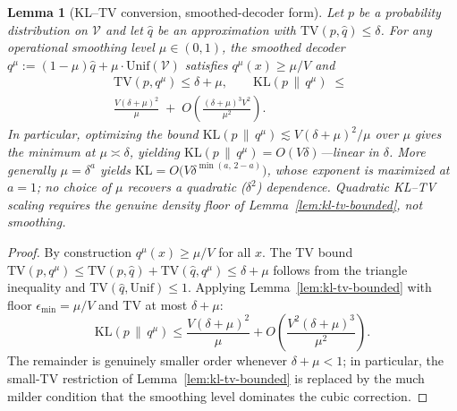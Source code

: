 \documentclass[11pt]{article}
\newcommand{\V}{\mathcal{V}}
\newcommand{\KLs}{\mathrm{KL}}
\newcommand{\TV}{\mathrm{TV}}
\theoremstyle{plain}
\newtheorem{lemma}[theorem]{Lemma}
\theoremstyle{definition}
\theoremstyle{remark}
\begin{document}
\begin{lemma}[KL--TV conversion, smoothed-decoder form]
\label{lem:kl-tv-smoothed}
Let $p$ be a probability distribution on $\V$ and let $\hat q$ be
an approximation with $\TV(p, \hat q) \leq \delta$. For any
\emph{operational smoothing level} $\mu \in (0, 1)$, the smoothed
decoder $q^{\mu} := (1-\mu) \hat q + \mu \cdot \mathrm{Unif}(\V)$
satisfies $q^{\mu}(x) \geq \mu/V$ and
\[
\begin{gathered}
\TV(p, q^{\mu}) \leq \delta + \mu, \qquad
\KLs(p \,\|\, q^{\mu})
\;\leq\;\\
\frac{V (\delta + \mu)^2}{\mu}
\;+\; O\!\left( \frac{(\delta + \mu)^3 V^2}{\mu^2} \right).
\end{gathered}
\]
In particular, optimizing the bound
$\KLs(p\,\|\,q^\mu) \lesssim V(\delta+\mu)^2/\mu$ over $\mu$ gives
the minimum at $\mu \asymp \delta$, yielding
$\KLs(p\,\|\,q^{\mu}) = O(V\delta)$---\emph{linear} in $\delta$.
More generally $\mu = \delta^a$ yields
$\KLs = O\bigl(V\delta^{\min(a,\,2-a)}\bigr)$, whose exponent is
maximized at $a=1$; no choice of $\mu$ recovers a quadratic
($\delta^2$) dependence. Quadratic KL--TV scaling requires the
genuine density floor of Lemma~\ref{lem:kl-tv-bounded}, not
smoothing.
\end{lemma}

\begin{proof}
By construction $q^{\mu}(x) \geq \mu/V$ for all $x$. The TV bound
$\TV(p, q^{\mu}) \leq \TV(p, \hat q) + \TV(\hat q, q^{\mu}) \leq
\delta + \mu$ follows from the triangle inequality and
$\TV(\hat q, \mathrm{Unif}) \leq 1$. Applying
Lemma~\ref{lem:kl-tv-bounded} with floor $\epsilon_{\min} = \mu/V$
and TV at most $\delta + \mu$:
\[
\KLs(p\,\|\,q^{\mu})
\leq \frac{V (\delta + \mu)^2}{\mu}
   + O\!\left( \frac{V^2 (\delta + \mu)^3}{\mu^2} \right).
\]
The remainder is genuinely smaller order whenever
$\delta + \mu < 1$; in particular, the small-TV restriction of
Lemma~\ref{lem:kl-tv-bounded} is replaced by the much milder
condition that the smoothing level dominates the cubic correction.
\end{proof}
\end{document}
